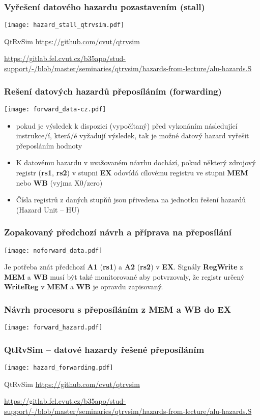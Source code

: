 \documentclass{beamer}
\begin{document}
\begin{frame}
\frametitle{Vyřešení datového hazardu pozastavením (stall)}
\texttt{[image: hazard\_stall\_qtrvsim.pdf]}

{\tiny
QtRvSim \url{https://github.com/cvut/qtrvsim}
}

{\Tiny
\url{https://gitlab.fel.cvut.cz/b35apo/stud-support/-/blob/master/seminaries/qtrvsim/hazards-from-lecture/alu-hazards.S}
}

\end{frame}


\begin{frame}
\frametitle{Rešení datových hazardů přeposíláním (forwarding)}
\texttt{[image: forward\_data-cz.pdf]}

\begin{itemize}
 \item pokud je výsledek k dispozici (vypočítaný) před vykonáním následující instrukce/í,
       která/é vyžadují výsledek, tak je možné datový hazard vyřešit přeposláním hodnoty
 \item K datovému hazardu v uvažovaném návrhu dochází, pokud některý zdrojový registr
       (\textbf{rs1}, \textbf{rs2}) v stupni \textbf{EX} odovídá cílovému registru
       ve stupni \textbf{MEM} nebo \textbf{WB} (vyjma X0/zero)
 \item Čísla registrů z daných stupňů jsou přivedena na jednotku řešení hazardů (Hazard Unit -- HU)
\end{itemize}

\end{frame}

\begin{frame}
\frametitle{Zopakovaný předchozí návrh a příprava na přeposílání}
\texttt{[image: noforward\_data.pdf]}

Je potřeba znát předchozí \textbf{A1} (\textbf{rs1}) a \textbf{A2} (\textbf{rs2}) v \textbf{EX}.
Signály \textbf{RegWrite} z \textbf{MEM} a \textbf{WB} musí být také monitorované aby potvrzovaly,
že registr určený \textbf{WriteReg} v \textbf{MEM} a \textbf{WB} je opravdu zapisovaný.

\end{frame}

\begin{frame}
\frametitle{Návrh procesoru s přeposíláním z MEM a WB do EX}
\texttt{[image: forward\_hazard.pdf]}
\end{frame}

\begin{frame}
\frametitle{QtRvSim -- datové hazardy řešené přeposíláním}
\texttt{[image: hazard\_forwarding.pdf]}

{\tiny
QtRvSim \url{https://github.com/cvut/qtrvsim}
}

{\Tiny
\url{https://gitlab.fel.cvut.cz/b35apo/stud-support/-/blob/master/seminaries/qtrvsim/hazards-from-lecture/alu-hazards.S}
}

\end{frame}
\end{document}
